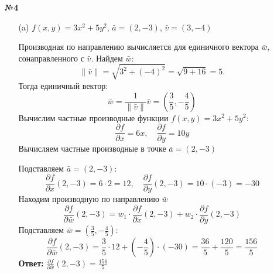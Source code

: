 \documentclass[a4paper]{article}
\begin{document}
\begin{enumerate}
    \item[\textbf{№4}]\begin{enumerate}
        \item[(a)]\( f(x, y) = 3x^2 + 5y^2 \), \( \bar{a} = (2, -3) \), 
        \( \bar{v} = (3, -4) \)
        
        Производная по направлению вычисляется для единичного вектора \( \bar{w} \),
         сонаправленного с \( \bar{v} \). Найдем \( \bar{w} \):
        \[
        \|\bar{v}\| = \sqrt{3^2 + (-4)^2} = \sqrt{9 + 16} = 5.
        \]
        Тогда единичный вектор:
        \[
        \bar{w} = \frac{1}{\|\bar{v}\|} \bar{v} = \left( \frac{3}{5}, -\frac{4}{5} \right)
        \]
        Вычислим частные производные функции \( f(x, y) = 3x^2 + 5y^2 \):
        \[
        \frac{\partial f}{\partial x} = 6x, \quad \frac{\partial f}{\partial y} = 10y
        \]
        Вычисляем частные производные в точке \( \bar{a} = (2, -3) \)
        
        Подставляем \( \bar{a} = (2, -3) \):
        \[
        \frac{\partial f}{\partial x}(2, -3) = 6 \cdot 2 = 12, \quad \frac{\partial f}{\partial y}(2, -3) = 10 \cdot (-3) = -30
        \]
        Находим производную по направлению \( \bar{w} \)
        \[
        \frac{\partial f}{\partial \bar{w}}(2, -3) = w_1 \cdot \frac{\partial f}{\partial x}(2, -3) + w_2 \cdot \frac{\partial f}{\partial y}(2, -3)
        \]
        Подставляем \( \bar{w} = \left( \frac{3}{5}, -\frac{4}{5} \right) \):
        \[
        \frac{\partial f}{\partial \bar{w}}(2, -3) = \frac{3}{5} \cdot 12 + \left( -\frac{4}{5} \right) \cdot (-30) = \frac{36}{5} + \frac{120}{5} = \frac{156}{5}
        \]
        \textbf{Ответ: } $\frac{\partial f}{\partial \bar{w}}(2, -3) = \frac{156}{5}$\\


\end{enumerate}
\end{enumerate}
\end{document}
